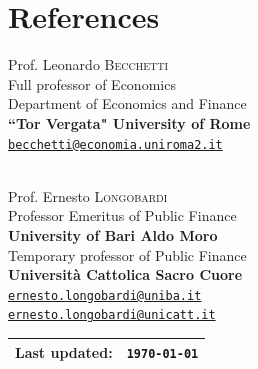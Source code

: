 \documentclass{article}
\begin{document}
\section*{References}
\begin{minipage}[t]{\textwidth}
\centering
\begin{minipage}[r]{.42\textwidth}
Prof. Leonardo \textsc{Becchetti}\\
Full professor of Economics\\
Department of Economics and Finance\\
\textbf{``Tor Vergata" University of Rome}\\
\texttt{\href{mailto:becchetti@economia.uniroma2.it}{becchetti@economia.uniroma2.it}}\\
{}\\
{}
\end{minipage}
\begin{minipage}[l]{.42\textwidth}
Prof. Ernesto \textsc{Longobardi}\\
Professor Emeritus of Public Finance\\
\textbf{University of Bari Aldo Moro}\\
Temporary professor of Public Finance\\
\textbf{Universit\`{a} Cattolica Sacro Cuore}\\
\texttt{\href{mailto:ernesto.longobardi@uniba.it}{ernesto.longobardi@uniba.it}}\\
\texttt{\href{mailto:ernesto.longobardi@unicatt.it}{ernesto.longobardi@unicatt.it}}
\end{minipage}
\end{minipage}
\begin{table}[h!]
\centering
\begin{tabular}{l c}
Last updated: & \texttt{\today}\\
\hline
\end{tabular}
\end{table}
\end{document}
